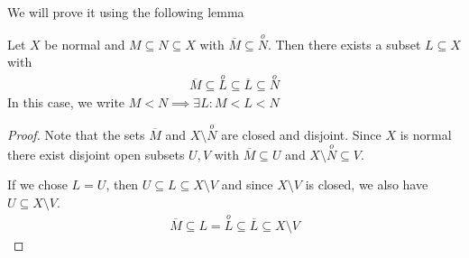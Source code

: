 We will prove it using the following lemma
\begin{lem}
Let $X$ be normal and $M \subseteq N \subseteq X$ with $\overline{M} \subseteq \stackrel{o}{N}$.
Then there exists a subset $L \subseteq X$ with
\begin{align*}
  \overline{M} \subseteq \stackrel{o}{L} \subseteq \overline{L} \subseteq \stackrel{o}{N}
\end{align*}
In this case, we write $M < N \implies \exists L: M < L < N$
\end{lem}
\begin{proof}
  Note that the sets $\overline{M}$ and $X \setminus \stackrel{o}{N}$ are closed and disjoint. Since $X$ is normal there exist disjoint open subsets $U,V$ with $\overline{M} \subseteq U$ and $X \setminus \stackrel{o}{N} \subseteq V$.

  If we chose $L = U$, then $U \subseteq L \subseteq X \setminus V$ and since $X \setminus V$ is closed, we also have $U \subseteq X \setminus V$.
  \begin{align*}
    \overline{M} \subseteq L = \stackrel{o}{L} \subseteq \overline{L} \subseteq X \setminus V
  \end{align*}
\end{proof}

